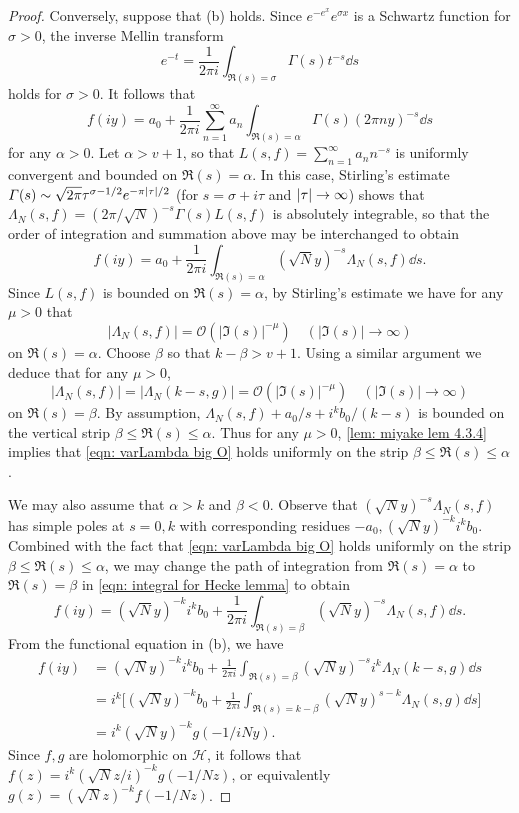 \documentclass[10pt,leqno,twoside]{article}
\theoremstyle{plain}
\theoremstyle{definition}
\numberwithin{equation}{section}
\numberwithin{lem}{section}
\begin{document}
\begin{proof}
    Conversely, suppose that (b) holds. Since $e^{-e^x}e^{\sigma x}$ is a Schwartz function for $\sigma>0$, the inverse Mellin transform 
    \[e^{-t} = \frac{1}{2\pi i}\int_{\Re(s) = \sigma}\varGamma(s)t^{-s}\dd s\]
    holds for $\sigma>0$. It follows that 
    \[f(iy) = a_0 + \frac{1}{2\pi i}\sum_{n=1}^\infty a_n\int_{\Re(s) =\alpha}\varGamma(s)(2\pi n y)^{-s}\dd s\] for any $\alpha>0$. Let $\alpha>v+1$, so that $L(s,f) = \sum_{n=1}^\infty a_nn^{-s}$ is uniformly convergent and bounded on $\Re(s) = \alpha$. In this case, Stirling's estimate $\varGamma(s)\sim \sqrt{2\pi} \tau^{\sigma -1/2}e^{-\pi\abs{\tau}/2}$ (for $s = \sigma + i\tau$ and $\abs{\tau}\to\infty$) shows that $\varLambda_N(s,f) = (2\pi/\sqrt{N})^{-s}\varGamma(s)L(s,f)$ is absolutely integrable, so that the order of integration and summation above may be interchanged to obtain
    \begin{equation}\label{eqn: integral for Hecke lemma}
        f(iy) = a_0 + \frac{1}{2\pi i} \int_{\Re(s) = \alpha} (\sqrt{N}y)^{-s}\varLambda_N(s,f)\dd s.
    \end{equation}
    Since $L(s,f)$ is bounded on $\Re(s) = \alpha$, by Stirling's estimate we have for any $\mu>0$ that 
    \begin{equation}\label{eqn: varLambda big O}
        |\varLambda_N(s,f)| = \mathcal O(|\Im(s)|^{-\mu})\quad (|\Im(s)|\to\infty)
    \end{equation}
    on $\Re(s) = \alpha$. Choose $\beta$ so that $k-\beta > v+1$. Using a similar argument we deduce that for any $\mu>0$, 
    \[|\varLambda_N(s,f)| = |\varLambda_N(k-s,g)| = \mathcal O(|\Im(s)|^{-\mu})\quad (|\Im(s)|\to\infty)\] on $\Re(s) = \beta$. By assumption, $\varLambda_N(s,f) + a_0/s+i^kb_0/(k-s)$ is bounded on the vertical strip $\beta\leq \Re(s)\leq \alpha$. Thus for any $\mu>0$, \cref{lem: miyake lem 4.3.4} implies that \cref{eqn: varLambda big O} holds uniformly on the strip $\beta\leq \Re(s)\leq \alpha$.
    
    We may also assume that $\alpha>k$ and $\beta<0$. Observe that $(\sqrt{N}y)^{-s}\varLambda_N(s,f)$ has simple poles at $s = 0,k$ with corresponding residues $-a_0,(\sqrt{N}y)^{-k}i^kb_0$. Combined with the fact that \cref{eqn: varLambda big O} holds uniformly on the strip $\beta\leq \Re(s)\leq \alpha$, we may change the path of integration from $\Re(s) = \alpha$ to $\Re(s) = \beta$ in \cref{eqn: integral for Hecke lemma} to obtain
    \[f(iy) = (\sqrt{N}y)^{-k}i^kb_0 + \frac{1}{2\pi i} \int_{\Re(s) = \beta} (\sqrt{N}y)^{-s}\varLambda_N(s,f) \dd s.\]
    From the functional equation in (b), we have 
    \begin{align*}
        f(iy) &= (\sqrt{N}y)^{-k}i^kb_0 + \frac{1}{2\pi i} \int_{\Re(s) = \beta} (\sqrt{N}y)^{-s}i^k\varLambda_N(k-s,g) \dd s\\
        &= i^k\bigg[(\sqrt{N}y)^{-k}b_0 + \frac{1}{2\pi i} \int_{\Re(s) = k-\beta} (\sqrt{N}y)^{s-k}\varLambda_N(s,g) \dd s\bigg]\\
        &= i^k(\sqrt{N}y)^{-k}g(-1/iNy).
    \end{align*}
    Since $f,g$ are holomorphic on $\mathcal H$, it follows that $f(z) = i^k(\sqrt{N}z/i)^{-k}g(-1/Nz)$, or equivalently $g(z) = (\sqrt{N}z)^{-k}f(-1/Nz)$.
\end{proof}
\end{document}
